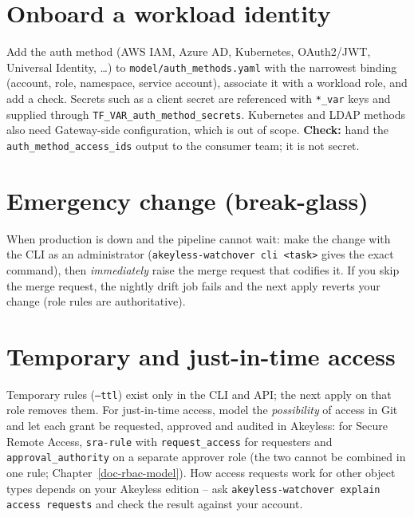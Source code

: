 \section{Onboard a workload identity}
Add the auth method (AWS IAM, Azure AD, Kubernetes, OAuth2/JWT, Universal Identity, \ldots) to
\texttt{model/auth\_methods.yaml} with the narrowest binding (account, role, namespace, service
account), associate it with a workload role, and add a check. Secrets such as a client secret are
referenced with \texttt{*\_var} keys and supplied through \texttt{TF\_VAR\_auth\_method\_secrets}.
Kubernetes and LDAP methods also need Gateway-side configuration, which is out of scope.
\textbf{Check:} hand the \texttt{auth\_method\_access\_ids} output to the consumer team; it is not secret.

\section{Emergency change (break-glass)}
When production is down and the pipeline cannot wait: make the change with the CLI as an
administrator (\texttt{akeyless-watchover cli <task>} gives the exact command), then
\emph{immediately} raise the merge request that codifies it. If you skip the merge request, the
nightly drift job fails and the next apply reverts your change (role rules are authoritative).

\section{Temporary and just-in-time access}
Temporary rules (\texttt{--ttl}) exist only in the CLI and API; the next apply on that role removes
them. For just-in-time access, model the \emph{possibility} of access in Git and let each grant be
requested, approved and audited in Akeyless: for Secure Remote Access, \texttt{sra-rule} with
\texttt{request\_access} for requesters and \texttt{approval\_authority} on a separate approver role
(the two cannot be combined in one rule; Chapter~\ref{doc-rbac-model}). How access requests work for
other object types depends on your Akeyless edition -- ask
\texttt{akeyless-watchover explain access requests} and check the result against your account.

